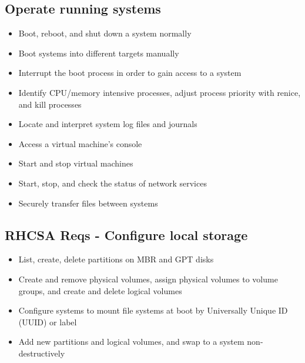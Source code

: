 \documentclass[letterpaper,10pt,english]{sphinxmanual}
\begin{document}
\subsection{Operate running systems}
\label{intro:operate-running-systems}\begin{itemize}
\item {} 
Boot, reboot, and shut down a system normally

\item {} 
Boot systems into different targets manually

\item {} 
Interrupt the boot process in order to gain access to a system

\item {} 
Identify CPU/memory intensive processes, adjust process priority with renice, and kill processes

\item {} 
Locate and interpret system log files and journals

\item {} 
Access a virtual machine's console

\item {} 
Start and stop virtual machines

\item {} 
Start, stop, and check the status of network services

\item {} 
Securely transfer files between systems

\end{itemize}


\subsection{RHCSA Reqs - Configure local storage}
\label{intro:rhcsa-reqs-configure-local-storage}\begin{itemize}
\item {} 
List, create, delete partitions on MBR and GPT disks

\item {} 
Create and remove physical volumes, assign physical volumes to volume groups, and create and delete logical volumes

\item {} 
Configure systems to mount file systems at boot by Universally Unique ID (UUID) or label

\item {} 
Add new partitions and logical volumes, and swap to a system non-destructively

\end{itemize}
\end{document}
